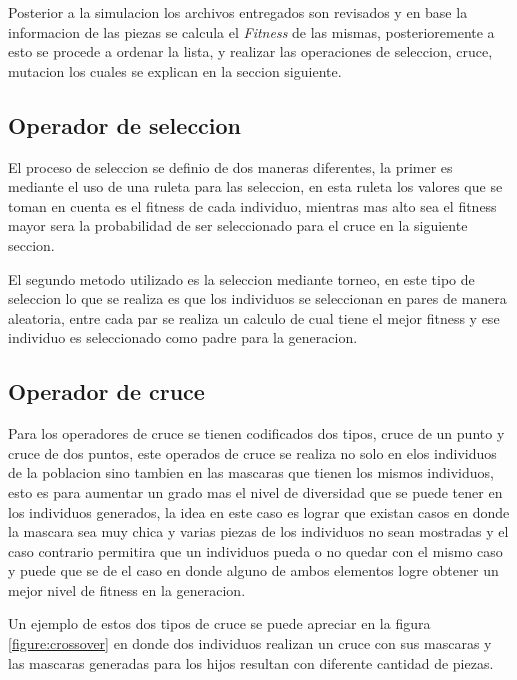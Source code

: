 Posterior a la simulacion los archivos entregados son revisados y en base la
informacion de las piezas se calcula el \textit{Fitness} de las mismas,
posterioremente a esto se procede a ordenar la lista, y realizar las operaciones
de seleccion, cruce, mutacion los cuales se explican en la seccion siguiente.

\subsection{Operador de seleccion}
\label{subsection:sel_operator}

El proceso de seleccion se definio de dos maneras diferentes, la primer es
mediante el uso de una ruleta para las seleccion, en esta ruleta los valores que
se toman en cuenta es el fitness de cada individuo, mientras mas alto sea el
fitness mayor sera la probabilidad de ser seleccionado para el cruce en la
siguiente seccion.

El segundo metodo utilizado es la seleccion mediante torneo, en este tipo de
seleccion lo que se realiza es que los individuos se seleccionan en pares de
manera aleatoria, entre cada par se realiza un calculo de cual tiene el mejor
fitness y ese individuo es seleccionado como padre para la generacion.

\subsection{Operador de cruce}
\label{subsection:crossover_operator}

Para los operadores de cruce se tienen codificados dos tipos, cruce de un punto
y cruce de dos puntos, este operados de cruce se realiza no solo en elos
individuos de la poblacion sino tambien en las mascaras que tienen los mismos
individuos, esto es para aumentar un grado mas el nivel de diversidad que se
puede tener en los individuos generados, la idea en este caso es lograr que
existan casos en donde la mascara sea muy chica y varias piezas de los
individuos no sean mostradas y el caso contrario permitira que un individuos
pueda o no quedar con el mismo caso y puede que se de el caso en donde alguno de
ambos elementos logre obtener un mejor nivel de fitness en la generacion.

Un ejemplo de estos dos tipos de cruce se puede apreciar en la figura
\ref{figure:crossover} en donde dos individuos realizan un cruce con sus
mascaras y las mascaras generadas para los hijos resultan con diferente cantidad
de piezas.

